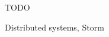 \begin{abstractgr}
TODO
\begin{keywordsgr}
Distributed systems, Storm
\end{keywordsgr}
\end{abstractgr}